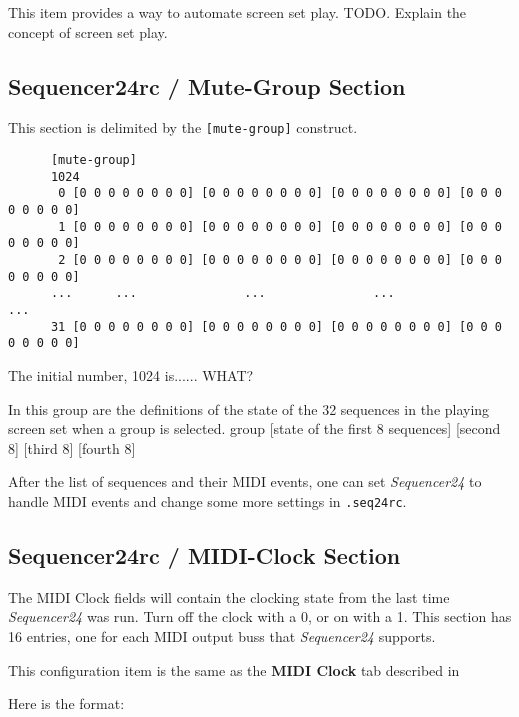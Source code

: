    This item provides a way to automate screen set play.
   TODO.
   Explain the concept of screen set play.

\subsection{Sequencer24rc / Mute-Group Section}
\label{subsec:seq24_rc_file_mute_group}
     
   This section is delimited by the \texttt{[mute-group]} construct.

   \begin{verbatim}
      [mute-group]
      1024
       0 [0 0 0 0 0 0 0 0] [0 0 0 0 0 0 0 0] [0 0 0 0 0 0 0 0] [0 0 0 0 0 0 0 0]
       1 [0 0 0 0 0 0 0 0] [0 0 0 0 0 0 0 0] [0 0 0 0 0 0 0 0] [0 0 0 0 0 0 0 0]
       2 [0 0 0 0 0 0 0 0] [0 0 0 0 0 0 0 0] [0 0 0 0 0 0 0 0] [0 0 0 0 0 0 0 0]
      ...      ...               ...               ...               ...
      31 [0 0 0 0 0 0 0 0] [0 0 0 0 0 0 0 0] [0 0 0 0 0 0 0 0] [0 0 0 0 0 0 0 0]
   \end{verbatim}

   The initial number, 1024 is...... WHAT?

   In this group are the definitions of the state of the 32 sequences
   in the playing screen set when a group is selected.
   group [state of the first 8 sequences] [second 8] [third 8] [fourth 8]

   After the list of sequences and their MIDI events, one can 
   set \textsl{Sequencer24} to handle MIDI events and change some more settings
   in \texttt{.seq24rc}.

\subsection{Sequencer24rc / MIDI-Clock Section}
\label{subsec:seq24_rc_file_midi_clock}

   The MIDI Clock fields will contain the clocking state from the last 
   time \textsl{Sequencer24} was run.  Turn off the clock with a 0, or on with a 1.
   This section has 16 entries, one for each MIDI output buss that
   \textsl{Sequencer24} supports.

   This configuration item is the same as the 
   \textbf{MIDI Clock} tab described in
   
   Here is the format:

